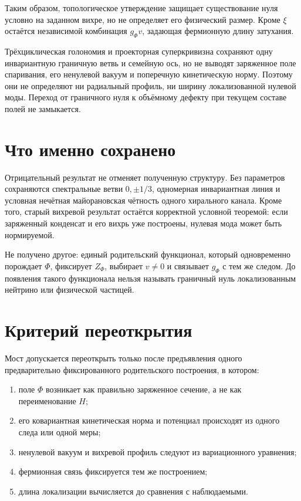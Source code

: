 Таким образом, топологическое утверждение защищает существование нуля
условно на заданном вихре, но не определяет его физический размер. Кроме
$\xi$ остаётся независимой комбинация $g_\Phi v$, задающая фермионную
длину затухания.

\begin{theorem}
Трёхциклическая голономия и проекторная суперкривизна сохраняют одну
инвариантную граничную ветвь и семейную ось, но не выводят заряженное поле
спаривания, его ненулевой вакуум и поперечную кинетическую норму. Поэтому
они не определяют ни радиальный профиль, ни ширину локализованной нулевой
моды. Переход от граничного нуля к объёмному дефекту при текущем составе
полей не замыкается.
\end{theorem}

\section{Что именно сохранено}

Отрицательный результат не отменяет полученную структуру. Без параметров
сохраняются спектральные ветви $0,\pm1/3$, одномерная инвариантная линия и
условная нечётная майорановская чётность одного хирального канала. Кроме
того, старый вихревой результат остаётся корректной условной теоремой:
если заряженный конденсат и его вихрь уже построены, нулевая мода может
быть нормируемой.

Не получено другое: единый родительский функционал, который одновременно
порождает $\Phi$, фиксирует $Z_\Phi$, выбирает $v\ne0$ и связывает
$g_\Phi$ с тем же следом. До появления такого функционала нельзя называть
граничный нуль локализованным нейтрино или физической частицей.

\section{Критерий переоткрытия}

Мост допускается переоткрыть только после предъявления одного
предварительно фиксированного родительского построения, в котором:
\begin{enumerate}
 \item поле $\Phi$ возникает как правильно заряженное сечение, а не как
 переименование $H$;
 \item его ковариантная кинетическая норма и потенциал происходят из одного
 следа или одной меры;
 \item ненулевой вакуум и вихревой профиль следуют из вариационного
 уравнения;
 \item фермионная связь фиксируется тем же построением;
 \item длина локализации вычисляется до сравнения с наблюдаемыми.
\end{enumerate}

